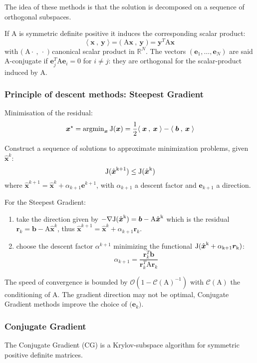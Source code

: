 \documentclass{article}
\newcommand{\xR}{\mathbb{R}}
\newcommand{\xRN}{{\xR^N}}
\newcommand{\bb}{{\boldsymbol b}}
\newcommand{\ee}{{\boldsymbol e}}
\newcommand{\rr}{{\boldsymbol r}}
\newcommand{\xx}{{\boldsymbol x}}
\newcommand{\hx}{\hat{\boldsymbol x}}
\newcommand{\yy}{{\boldsymbol y}}
\newcommand{\mA}{{\mathrm A}}
\newcommand{\Seq}[1]{\bigl(#1\bigr)}
\newcommand{\Cond}[1]{\mathcal{C}(#1)}
\newcommand{\Order}[1]{\mathcal{O}\left(#1\right)}
\newcommand{\InnerK}[2]{{{\mathbf\langle}\;#1\:,\: #2 \;{\rangle}}}
\newcommand{\Inner}[2]{{{\scriptstyle\mathbf{(}}\;#1\:,\: #2 \;{\scriptstyle\mathbf{)}}}}
\begin{document}
The idea of these methods is that the solution is decomposed on a sequence of orthogonal subspaces.

If $\mA$ is symmetric definite positive it induces the corresponding scalar product:
\[
\InnerK{\xx}{\yy} = \Inner{\mA \xx}{\yy} = \yy^T\mA\xx
\]
with $\Inner{\mA \cdot}{\cdot}$ canonical scalar product in $\xRN$.
The vectors $(\ee_1, \dots, \ee_N)$ are said $\mA$-conjugate if $\ee_j^T\mA\ee_i = 0$ for $i\neq j$: they are orthogonal for the scalar-product induced by $\mA$.

\subsubsection{Principle of descent methods: Steepest Gradient }

Minimisation of the residual:
\begin{equation*}
\xx^\star = \mathrm{argmin}_\xx \:\rm J(\xx) = \frac{1}{2}\InnerK{\xx}{\xx} - \InnerK{\bb}{\xx}
\end{equation*}

Construct a sequence of solutions to approximate minimization problems, given $\hx^k$:
\[
\rm J(\hx^{k+1}) \leq \rm J(\hx^k)
\]
where $\hx^{k+1} = \hx^{k} + \alpha_{k+1} \ee^{k+1}$, with $\alpha_{k+1}$ a descent factor and $\ee_{k+1}$ a direction.

\medskip
For the Steepest Gradient:
\begin{enumerate}
\item take the direction given by $-\nabla\rm J(\hx^k) = \bb - \mA \hx^k$ which is the residual $\rr_k = \bb - \mA\hx^k$, thus $\hx^{k+1} = \hx^{k} + \alpha_{k+1} \rr_k$.
\item choose the descent factor $\alpha^{k+1}$ minimizing the functional $\rm J(\hx^{k} + \alpha_{k+1} \rr_k)$:
\[
\alpha_{k+1} = \frac{\rr_k^T\bb}{\rr_k^T\mA\rr_k}
\]
\end{enumerate}

\medskip
The speed of convergence is bounded by $\Order{1- \Cond{\mA}^{-1}}$ with $\Cond{\mA}$ the conditioning of $\mA$.
The gradient direction may not be optimal, Conjugate Gradient methods improve the choice of $\Seq{\ee_k}$.

\subsubsection{Conjugate Gradient}

The Conjugate Gradient (CG) is a Krylov-subspace algorithm for symmetric positive definite matrices.
\end{document}
